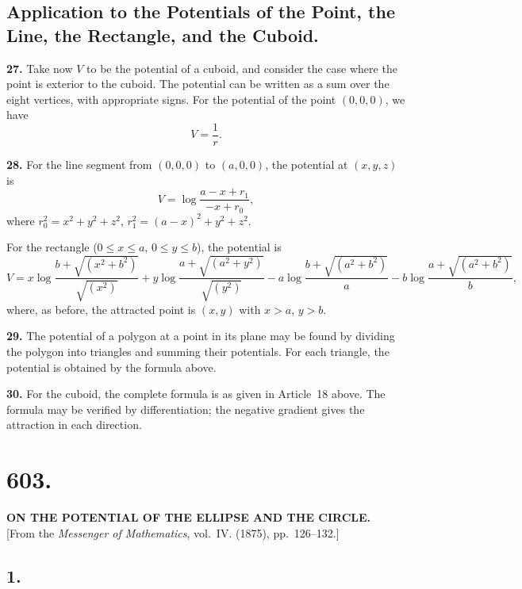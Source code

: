 \documentclass[11pt,a4paper]{article}
\begin{document}
\subsection*{Application to the Potentials of the Point, the Line, the Rectangle, and the Cuboid.}

\smallskip\noindent\textbf{27.}\quad
Take now $V$ to be the potential of a cuboid, and consider the case where
the point is exterior to the cuboid. The potential can be written as a sum
over the eight vertices, with appropriate signs. For the potential of the
point $(0,0,0)$, we have
\[
V = \frac{1}{r}.
\]

\smallskip\noindent\textbf{28.}\quad
For the line segment from $(0,0,0)$ to $(a,0,0)$, the potential at $(x,y,z)$
is
\[
V = \log\frac{a-x+r_1}{-x+r_0},
\]
where $r_0^2=x^2+y^2+z^2$, $r_1^2=(a-x)^2+y^2+z^2$.

\newpage
\noindent For the rectangle ($0\leq x\leq a$, $0\leq y\leq b$), the potential is
\[
V = x\log\frac{b+\sqrt{(x^2+b^2)}}{\sqrt{(x^2)}}
  + y\log\frac{a+\sqrt{(a^2+y^2)}}{\sqrt{(y^2)}}
  - a\log\frac{b+\sqrt{(a^2+b^2)}}{a}
  - b\log\frac{a+\sqrt{(a^2+b^2)}}{b},
\]
where, as before, the attracted point is $(x,y)$ with $x>a$, $y>b$.

\smallskip\noindent\textbf{29.}\quad
The potential of a polygon at a point in its plane may be found by dividing
the polygon into triangles and summing their potentials. For each triangle,
the potential is obtained by the formula above.

\smallskip\noindent\textbf{30.}\quad
For the cuboid, the complete formula is as given in Article~18 above. The
formula may be verified by differentiation; the negative gradient gives the
attraction in each direction.

\newpage
\section*{603.}
\begin{center}
{\large\bfseries ON THE POTENTIAL OF THE ELLIPSE AND THE CIRCLE.}\\[0.5em]
[From the \textit{Messenger of Mathematics}, vol.~IV. (1875), pp.~126--132.]
\end{center}

\subsection*{1.}
\end{document}

